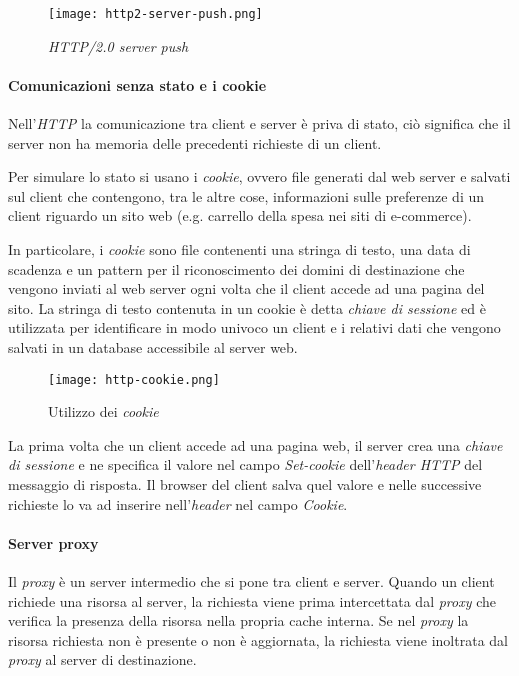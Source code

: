 \begin{figure}[h]
    \centering
    \texttt{[image: http2-server-push.png]}
    \caption{\emph{HTTP/2.0 server push}}
\end{figure}

\paragraph{Comunicazioni senza stato e i cookie}
Nell'\emph{HTTP} la comunicazione tra client e server è priva di stato, ciò
significa che il server non ha memoria delle precedenti richieste di un client.

Per simulare lo stato si usano i \emph{cookie}, ovvero file generati dal web
server e salvati sul client che contengono, tra le altre cose, informazioni sulle
preferenze di un client riguardo un sito web (e.g. carrello della
spesa nei siti di e-commerce).

In particolare, i \emph{cookie} sono file contenenti una stringa di testo, una
data di scadenza e un pattern per il riconoscimento dei domini di destinazione
che vengono inviati al web server ogni volta che il client accede ad una pagina
del sito.
La stringa di testo contenuta in un cookie è detta \emph{chiave di sessione} ed
è utilizzata per identificare in modo univoco un client e i relativi dati
che vengono salvati in un database accessibile al server web.

\begin{figure}[h]
    \centering
    \texttt{[image: http-cookie.png]}
    \caption{Utilizzo dei \emph{cookie}}
\end{figure}\noindent
La prima volta che un client accede ad una pagina web, il server crea una
\emph{chiave di sessione} e ne specifica il valore nel campo \emph{Set-cookie}
dell'\emph{header HTTP} del messaggio di risposta. Il browser del client salva
quel valore e nelle successive richieste lo va ad inserire nell'\emph{header}
nel campo \emph{Cookie}.

\paragraph{Server proxy}
Il \emph{proxy} è un server intermedio che si pone tra client e server.
Quando un client richiede una risorsa al server, la richiesta viene prima
intercettata dal \emph{proxy} che verifica la presenza della risorsa nella propria
cache interna. Se nel \emph{proxy} la risorsa richiesta non è presente o non è
aggiornata, la richiesta viene inoltrata dal \emph{proxy} al server di destinazione.

